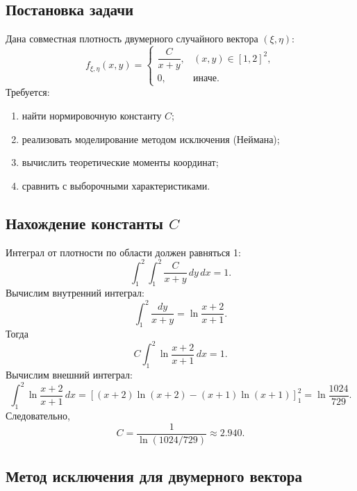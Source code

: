 \documentclass[bachelor, och, pract3]{SCWorks}
\begin{document}
\subsection{Постановка задачи}

Дана совместная плотность двумерного случайного вектора $(\xi,\eta)$:
\[
f_{\xi,\eta}(x,y) = 
\begin{cases}
\dfrac{C}{x+y}, & (x,y)\in[1,2]^2,\\
0, & \text{иначе}.
\end{cases}
\]
Требуется:
\begin{enumerate}
    \item найти нормировочную константу $C$;
    \item реализовать моделирование методом исключения (Неймана);
    \item вычислить теоретические моменты координат;
    \item сравнить с выборочными характеристиками.
\end{enumerate}

\subsection{Нахождение константы $C$}

Интеграл от плотности по области должен равняться 1:
\[
\int_1^2\int_1^2 \frac{C}{x+y}\,dy\,dx = 1.
\]
Вычислим внутренний интеграл:
\[
\int_1^2 \frac{dy}{x+y} = \ln\frac{x+2}{x+1}.
\]
Тогда
\[
C \int_1^2 \ln\frac{x+2}{x+1}\,dx = 1.
\]
Вычислим внешний интеграл:
\[
\int_1^2 \ln\frac{x+2}{x+1}\,dx = \left[(x+2)\ln(x+2) - (x+1)\ln(x+1)\right]_1^2
= \ln\frac{1024}{729}.
\]
Следовательно,
\[
C = \frac{1}{\ln(1024/729)} \approx 2.940.
\]


%

\subsection{Метод исключения для двумерного вектора}
\end{document}
